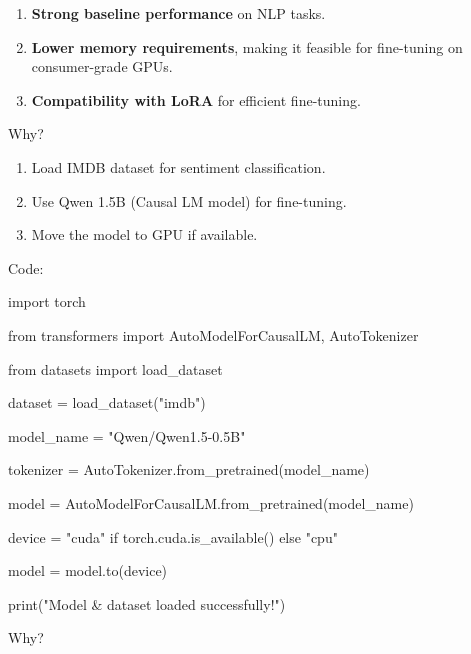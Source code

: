\documentclass{article} %
\begin{document}
\begin{enumerate}
\item  \textbf{Strong baseline performance} on NLP tasks.

\item  \textbf{Lower memory requirements}, making it feasible for fine-tuning on consumer-grade GPUs.

\item  \textbf{Compatibility with LoRA} for efficient fine-tuning.
\end{enumerate}

\noindent \begin{flushleft}


\noindent Why?
\end{flushleft}

\begin{enumerate}
\item  Load IMDB dataset for sentiment classification.

\item  Use Qwen 1.5B (Causal LM model) for fine-tuning.

\item  Move the model to GPU if available.
\end{enumerate}

\noindent \begin{flushleft}
Code:

\noindent import torch

\noindent from transformers import AutoModelForCausalLM, AutoTokenizer

\noindent from datasets import load\_dataset

\noindent dataset = load\_dataset("imdb")

\noindent model\_name = "Qwen/Qwen1.5-0.5B"

\noindent tokenizer = AutoTokenizer.from\_pretrained(model\_name)

\noindent model = AutoModelForCausalLM.from\_pretrained(model\_name)

\noindent device = "cuda" if torch.cuda.is\_available() else "cpu"

\noindent model = model.to(device)

\noindent print("Model \& dataset loaded successfully!")

\noindent 
\newline

\noindent \textbf{}

\noindent Why?
\end{flushleft}
\end{document}
